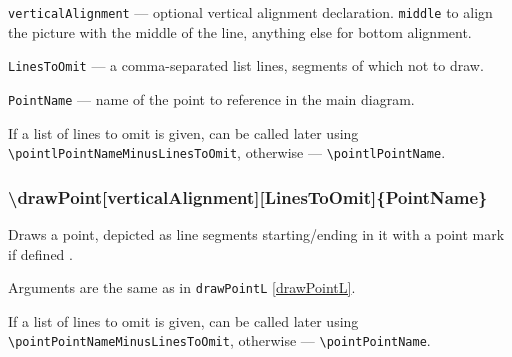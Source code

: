 \documentclass{ltxdoc}
\begin{document}
	\texttt{verticalAlignment} — optional vertical alignment declaration. \texttt{middle} to align the picture with the middle of the line, anything else for bottom alignment.
	
	\texttt{LinesToOmit} — a comma-separated list lines, segments of which not to draw. 
	
	\texttt{PointName} — name of the point to reference in the main diagram. 
	
	If a list of lines to omit is given, can be called later using \texttt{\textbackslash pointlPointNameMinusLinesToOmit}, otherwise — \texttt{\textbackslash pointlPointName}. 

\subsubsection{\textbackslash drawPoint[verticalAlignment][LinesToOmit]\{PointName\}}

	Draws a point, depicted as line segments starting/ending in it with a point mark if defined .

	Arguments are the same as in \texttt{drawPointL} \ref{drawPointL}.
	
	If a list of lines to omit is given, can be called later using \texttt{\textbackslash pointPointNameMinusLinesToOmit}, otherwise — \texttt{\textbackslash pointPointName}. 

\end{document}
